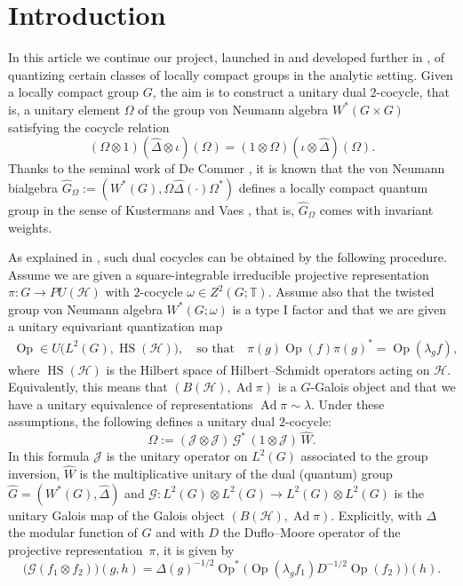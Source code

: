 \documentclass[a4paper,11pt,reqno]{amsart}
\numberwithin{equation}{section}
\theoremstyle{remark}
\theoremstyle{definition}
\newcommand\Dhat{{\hat\Delta}}
\newcommand\Ad{\operatorname{Ad}}
\newcommand\HS{\operatorname{HS}}
\newcommand\Op{\operatorname{Op}}
\newcommand\T{{\mathbb T}}
\newcommand{\G}{{\mathcal G}}
\newcommand{\CJ}{\mathcal J}
\newcommand{\CH}{\mathcal H}
\begin{document}
\section*{Introduction}

In this article we continue our project, launched in \cite{BGNT3} and developed further in \cites{GM, BGNT4}, of quantizing certain classes of locally compact groups in the analytic setting.
Given a locally compact group $G$, the aim is to construct a unitary dual $2$-cocycle, that is, a unitary element  $\Omega$ of the group von Neumann
algebra  $W^*(G\times G)$ satisfying the cocycle relation
$$
(\Omega\otimes1)(\Dhat\otimes\iota)(\Omega)=(1\otimes\Omega)(\iota\otimes\Dhat)(\Omega).
$$
Thanks to the seminal  work of De Commer \cite{DC}, it is known that the von Neumann bialgebra $\hat G_\Omega:=(W^*(G),\Omega\Dhat(\cdot)\Omega^*)$
defines a locally compact
quantum group in the sense of Kustermans and Vaes \cites{KV1,KV2}, that is,  $\hat G_\Omega$ comes with invariant weights.

As explained in \cite{BGNT3}, such dual cocycles can be obtained by the following procedure. Assume we are given a square-integrable irreducible projective representation $\pi\colon G\to PU(\CH)$ with $2$-cocycle $\omega\in Z^2(G;\T)$. Assume also that the twisted group von Neumann algebra $W^*(G;\omega)$ is a type I factor and that  we are given a unitary equivariant quantization map
\begin{align*}
\Op\in U\big(L^2(G),\HS(\CH)\big), \quad\text{so that}\quad \pi(g)\Op(f)\pi(g)^*=\Op(\lambda_gf),
\end{align*}
where $\HS(\CH)$ is the Hilbert space of Hilbert--Schmidt operators acting on $\CH$.
Equivalently, this means  that $(B(\CH),\Ad\pi)$ is a $G$-Galois object and that we have a unitary equivalence of representations $\Ad\pi\sim\lambda$.
Under these assumptions, the following  defines a unitary dual $2$-cocycle:
$$
\Omega:= (\CJ\otimes\CJ)\,\G^*\,  (1\otimes\CJ)\, \hat W.
$$
In this formula  $\CJ$ is the unitary operator on $L^2(G)$ associated to the group inversion, $\hat W$ is the multiplicative unitary of the dual
(quantum) group $\hat G=(W^*(G),\Dhat)$ and
$\G\colon L^2(G)\otimes L^2(G)\to L^2(G)\otimes L^2(G)$ is the unitary Galois map of the Galois object $(B(\CH),\Ad\pi)$. Explicitly, with $\Delta$ the modular function of $G$ and with $D$   the Duflo--Moore operator  of the projective representation~$\pi$,  it is given  by
$$
\big(\G(f_1\otimes f_2)\big)(g,h)=\Delta(g)^{-1/2}\Op^*\big(\Op(\lambda_{g}f_1)D^{-1/2}\Op(f_2)\big)(h).
$$
\end{document}
